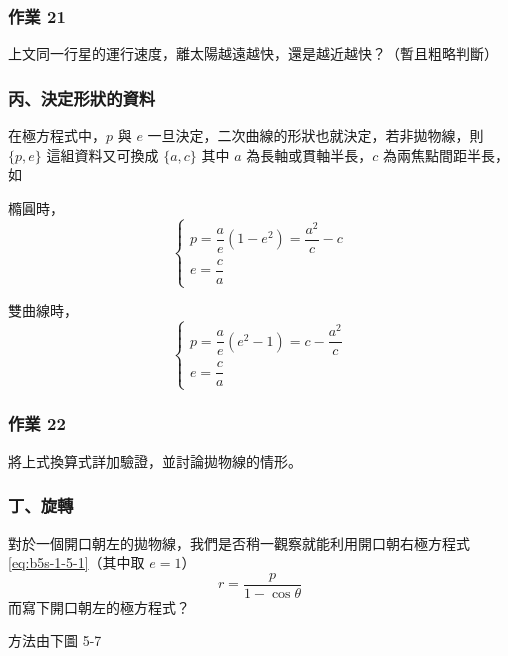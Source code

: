 \subsubsection*{作業 21}
上文同一行星的運行速度，離太陽越遠越快，還是越近越快？（暫且粗略判斷）

\subsubsection*{丙、決定形狀的資料}

在極方程式中，$p$ 與 $e$ 一旦決定，二次曲線的形狀也就決定，若非拋物線，則 $\{p, e\}$ 這組資料又可換成 $\{a, c\}$ 其中 $a$ 為長軸或貫軸半長，$c$ 為兩焦點間距半長，如

橢圓時，
\[
  \begin{cases}
    p = \dfrac{a}{e}(1 - e^2) = \dfrac{a^2}{c} - c \\[0.8em]
    e = \dfrac{c}{a}
  \end{cases}
\]

雙曲線時，
\[
  \begin{cases}
    p = \dfrac{a}{e}(e^2 - 1) = c - \dfrac{a^2}{c} \\[0.8em]
    e = \dfrac{c}{a}
  \end{cases}
\]

\subsubsection*{作業 22}
將上式換算式詳加驗證，並討論拋物線的情形。

\subsubsection*{丁、旋轉}

對於一個開口朝左的拋物線，我們是否稍一觀察就能利用開口朝右極方程式 \eqref{eq:b5s-1-5-1}（其中取 $e = 1$）
\[
  r = \frac{p}{1 - \cos\theta}
\]
而寫下開口朝左的極方程式？

方法由下圖 5-7

